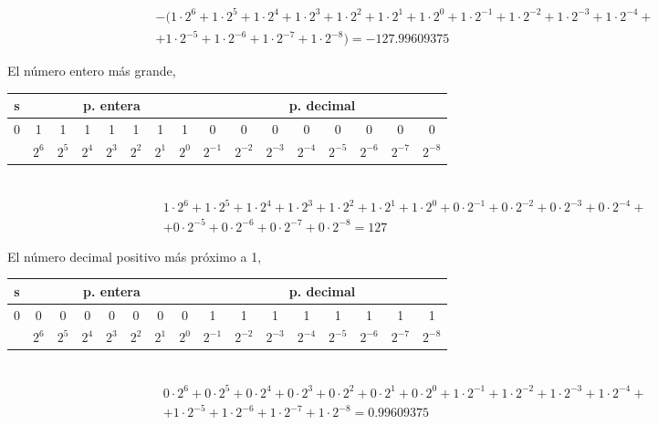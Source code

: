 \begin{equation*}
\begin{split}
&-(1\cdot 2^6+1 \cdot 2^5+ 1\cdot 2^4+ 1 \cdot 2^3+ 1 \cdot 2^2 + 1 \cdot 2^1 + 1 \cdot 2^0 + 1 \cdot 2^{-1}+ 1 \cdot 2^{-2}+ 1 \cdot 2^{-3}+ 1 \cdot 2^{-4}+\\
&+ 1 \cdot 2^{-5}+1 \cdot 2^{-6} +1 \cdot 2^{-7}+ 1\cdot 2^{-8}) =  -127.99609375
\end{split}
\end{equation*}

El número entero más grande,\\

\begin{tabular}{|c||c|c|c|c|c|c|c||c|c|c|c|c|c|c|c|}
\hline
s&\multicolumn{7}{c||}{p. entera}&\multicolumn{8}{c|}{p. decimal}\\
\hline
0&1&1&1&1&1&1&1&0&0&0&0&0&0&0&0\\
\hline
&$2^{6}$&$2^{5}$&$2^{4}$&$2^{3}$&$2^{2}$&$2^{1}$&$2^{0}$&$2^{-1}$&$2^{-2}$&$2^{-3}$&$2^{-4}$&$2^{-5}$&$2^{-6}$&$2^{-7}$&$2^{-8}$\\
\hline
\end{tabular}\\

\begin{equation*}
\begin{split}
&1\cdot 2^6+1 \cdot 2^5+ 1\cdot 2^4+ 1 \cdot 2^3+ 1 \cdot 2^2 + 1 \cdot 2^1 + 1 \cdot 2^0 + 0 \cdot 2^{-1}+ 0 \cdot 2^{-2}+ 0 \cdot 2^{-3}+ 0 \cdot 2^{-4}+\\
&+ 0 \cdot 2^{-5}+0 \cdot 2^{-6} +0 \cdot 2^{-7}+0\cdot 2^{-8} =  127
\end{split}
\end{equation*}

El número decimal positivo más próximo a 1,\\

\begin{tabular}{|c||c|c|c|c|c|c|c||c|c|c|c|c|c|c|c|}
\hline
s&\multicolumn{7}{c||}{p. entera}&\multicolumn{8}{c|}{p. decimal}\\
\hline
0&0&0&0&0&0&0&0&1&1&1&1&1&1&1&1\\
\hline
&$2^{6}$&$2^{5}$&$2^{4}$&$2^{3}$&$2^{2}$&$2^{1}$&$2^{0}$&$2^{-1}$&$2^{-2}$&$2^{-3}$&$2^{-4}$&$2^{-5}$&$2^{-6}$&$2^{-7}$&$2^{-8}$\\
\hline
\end{tabular}\\

\begin{equation*}
\begin{split}
&0\cdot 2^6+0 \cdot 2^5+ 0\cdot 2^4+ 0\cdot 2^3+ 0\cdot 2^2 + 0\cdot 2^1 + 0 \cdot 2^0 + 1 \cdot 2^{-1}+ 1 \cdot 2^{-2}+ 1 \cdot 2^{-3}+ 1 \cdot 2^{-4}+ \\
&+1 \cdot 2^{-5}+1 \cdot 2^{-6} +1 \cdot 2^{-7}+1 \cdot 2^{-8} =  0.99609375
\end{split}
\end{equation*}


